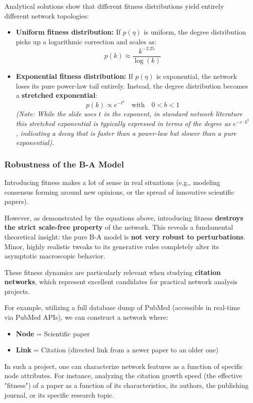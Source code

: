 Analytical solutions show that different fitness distributions yield entirely different network topologies:
\begin{itemize}
    \item \textbf{Uniform fitness distribution:} If \( p(\eta) \) is uniform, the degree distribution picks up a logarithmic correction and scales as:
          \[
              p(k) \approx \frac{k^{-2.25}}{\log(k)}
          \]
    \item \textbf{Exponential fitness distribution:} If \( p(\eta) \) is exponential, the network loses its pure power-law tail entirely. Instead, the degree distribution becomes a \textbf{stretched exponential}:
          \[
              p(k) \propto e^{-t^b} \quad \text{with} \quad 0 < b < 1
          \]
          \textit{(Note: While the slide uses \( t \) in the exponent, in standard network literature this stretched exponential is typically expressed in terms of the degree as \( e^{-c \cdot k^b} \), indicating a decay that is faster than a power-law but slower than a pure exponential).}
\end{itemize}

\subsubsection{Robustness of the B-A Model}

Introducing fitness makes a lot of sense in real situations (e.g., modeling consensus forming around new opinions, or the spread of innovative scientific papers).

However, as demonstrated by the equations above, introducing fitness \textbf{destroys the strict scale-free property} of the network. This reveals a fundamental theoretical insight: the pure B-A model is \textbf{not very robust to perturbations}. Minor, highly realistic tweaks to its generative rules completely alter its asymptotic macroscopic behavior.

\begin{example}
    These fitness dynamics are particularly relevant when studying \textbf{citation networks}, which represent excellent candidates for practical network analysis projects.

    For example, utilizing a full database dump of PubMed (accessible in real-time via PubMed APIs), we can construct a network where:
    \begin{itemize}
        \item \textbf{Node} = Scientific paper
        \item \textbf{Link} = Citation (directed link from a newer paper to an older one)
    \end{itemize}

    In such a project, one can characterize network features as a function of specific node attributes. For instance, analyzing the citation growth speed (the effective "fitness") of a paper as a function of its characteristics, its authors, the publishing journal, or its specific research topic.
\end{example}

